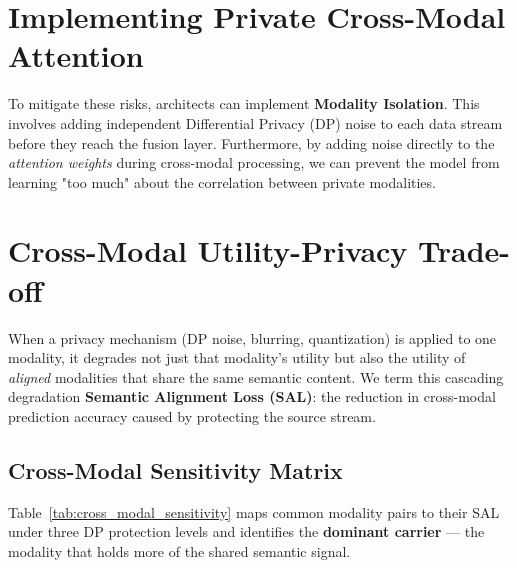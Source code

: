 \section{Implementing Private Cross-Modal Attention}
\label{sec:private_attention_ch16}

To mitigate these risks, architects can implement \textbf{Modality Isolation}. This involves adding independent Differential Privacy (DP) noise to each data stream before they reach the fusion layer. Furthermore, by adding noise directly to the \textit{attention weights} during cross-modal processing, we can prevent the model from learning "too much" about the correlation between private modalities.

\section{Cross-Modal Utility-Privacy Trade-off}
\label{sec:cross_modal_tradeoff}

When a privacy mechanism (DP noise, blurring, quantization) is applied to one modality, it degrades not just that modality's utility but also the utility of \emph{aligned} modalities that share the same semantic content. We term this cascading degradation \textbf{Semantic Alignment Loss (SAL)}: the reduction in cross-modal prediction accuracy caused by protecting the source stream.

\subsection{Cross-Modal Sensitivity Matrix}
\label{subsec:cross_modal_matrix}

Table~\ref{tab:cross_modal_sensitivity} maps common modality pairs to their SAL under three DP protection levels and identifies the \textbf{dominant carrier} --- the modality that holds more of the shared semantic signal.


